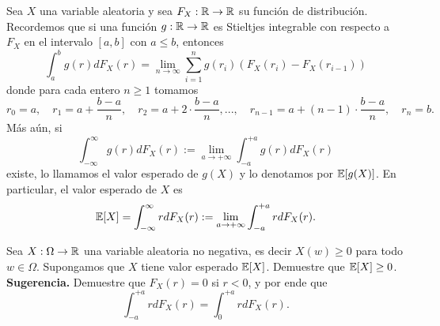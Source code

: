 \documentclass[11pt]{scrartcl}
\begin{document}
\noindent Sea $X$ una variable aleatoria y sea $F_X:\mathbb R\rightarrow\mathbb R$ su función de distribución. Recordemos que si una función $g:\mathbb R\rightarrow\mathbb R$
es Stieltjes integrable con respecto a $F_X$ en el intervalo $[a,b]$ con $a\leq b$, entonces
\begin{equation*}
    \int_{a}^{b}g(r)dF_X(r) = \lim_{n\to \infty}\sum_{i=1}^{n}g(r_i)\left(F_X(r_i)-F_X(r_{i-1})\right)
\end{equation*}
donde para cada entero $n\geq 1$ tomamos
\begin{equation*}
    r_0=a, \quad r_1=a+\frac{b-a}{n}, \quad r_2=a+2\cdot\frac{b-a}{n},..., \quad r_{n-1}=a+(n-1)\cdot\frac{b-a}{n},\quad r_n=b.
\end{equation*}
Más aún, si
\begin{equation*}
    \int_{-\infty}^{\infty}g(r)dF_X(r) := \lim_{a\to +\infty}\int_{-a}^{+a}g(r)dF_X(r)
\end{equation*}
existe, lo llamamos el valor esperado de $g(X)$ y lo denotamos por $\mathbb E[g(X)]$. En particular, el valor esperado de $X$ es
\begin{equation*}
    \mathbb E[X]=\int_{-\infty}^{\infty}rdF_X(r) := \lim_{a\to +\infty}\int_{-a}^{+a}rdF_X(r).
\end{equation*}
\begin{mdframed}[style=mdpurplebox, frametitle={Ejercicio 07, Tarea 11, Probabilidad y Estadística I}]
    Sea $X:\Omega\rightarrow\mathbb R$ una variable aleatoria no negativa, es decir $X(w)\geq 0$ para todo $w \in \Omega$. Supongamos que $X$ tiene valor
    esperado $\mathbb E[X]$. Demuestre que $\mathbb E[X]\geq 0$. \\
    \textbf{Sugerencia.} Demuestre que $F_X(r)=0$ si $r<0$, y por ende que
    \begin{equation*}
        \int_{-a}^{+a}rdF_X(r)=\int_{0}^{+a}rdF_X(r).   
    \end{equation*}
\end{mdframed}
\end{document}
